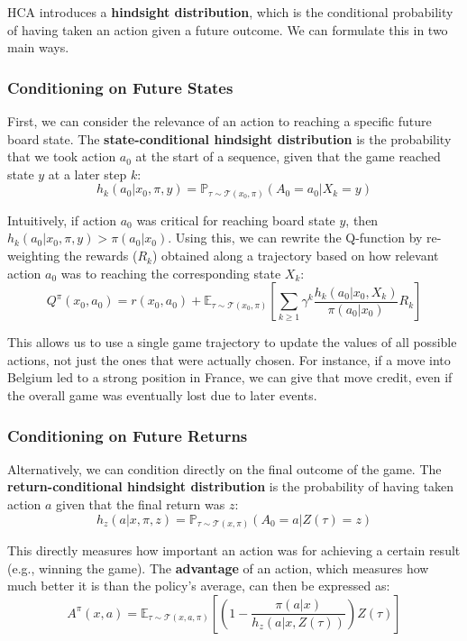 \documentclass[oneside]{memoir}
\begin{document}
HCA introduces a \textbf{hindsight distribution}, which is the conditional probability of having taken an action given a future outcome. We can formulate this in two main ways.

\subsubsection{Conditioning on Future States}

First, we can consider the relevance of an action to reaching a specific future board state. The \textbf{state-conditional hindsight distribution} is the probability that we took action $a_0$ at the start of a sequence, given that the game reached state $y$ at a later step $k$:
$$
h_k(a_0|x_0, \pi, y) = \mathbb{P}_{\tau \sim \mathcal{T}(x_0, \pi)}(A_0 = a_0 | X_k = y)
$$

Intuitively, if action $a_0$ was critical for reaching board state $y$, then $h_k(a_0|x_0, \pi, y) > \pi(a_0|x_0)$. Using this, we can rewrite the Q-function by re-weighting the rewards ($R_k$) obtained along a trajectory based on how relevant action $a_0$ was to reaching the corresponding state $X_k$:
$$
Q^{\pi}(x_0, a_0) = r(x_0, a_0) + \mathbb{E}_{\tau \sim \mathcal{T}(x_0, \pi)}\left[\sum_{k \ge 1} \gamma^k \frac{h_k(a_0|x_0, X_k)}{\pi(a_0|x_0)}R_k\right]
$$

This allows us to use a single game trajectory to update the values of all possible actions, not just the ones that were actually chosen. For instance, if a move into Belgium led to a strong position in France, we can give that move credit, even if the overall game was eventually lost due to later events.

\subsubsection{Conditioning on Future Returns}

Alternatively, we can condition directly on the final outcome of the game. The \textbf{return-conditional hindsight distribution} is the probability of having taken action $a$ given that the final return was $z$:
$$
h_z(a|x, \pi, z) = \mathbb{P}_{\tau \sim \mathcal{T}(x, \pi)}(A_0 = a | Z(\tau) = z)
$$

This directly measures how important an action was for achieving a certain result (e.g., winning the game). The \textbf{advantage} of an action, which measures how much better it is than the policy's average, can then be expressed as:
$$
A^{\pi}(x, a) = \mathbb{E}_{\tau \sim \mathcal{T}(x, a, \pi)}\left[\left(1 - \frac{\pi(a|x)}{h_z(a|x, Z(\tau))}\right)Z(\tau)\right]
$$
\end{document}
